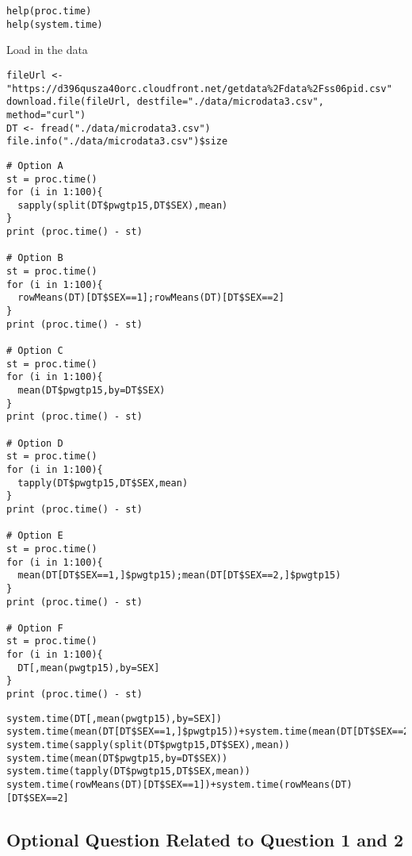 \documentclass[]{article}
\begin{document}
\begin{framed}
\begin{verbatim}
help(proc.time)
help(system.time)
\end{verbatim}
\end{framed}
Load in the data
\begin{framed}
\begin{verbatim}
fileUrl <- "https://d396qusza40orc.cloudfront.net/getdata%2Fdata%2Fss06pid.csv"
download.file(fileUrl, destfile="./data/microdata3.csv", method="curl")
DT <- fread("./data/microdata3.csv")
file.info("./data/microdata3.csv")$size
\end{verbatim}
\end{framed}
\newpage
\begin{framed}
\begin{verbatim}
# Option A
st = proc.time()
for (i in 1:100){
  sapply(split(DT$pwgtp15,DT$SEX),mean)
}
print (proc.time() - st)

# Option B
st = proc.time()
for (i in 1:100){
  rowMeans(DT)[DT$SEX==1];rowMeans(DT)[DT$SEX==2]
}
print (proc.time() - st)

# Option C
st = proc.time()
for (i in 1:100){
  mean(DT$pwgtp15,by=DT$SEX)
}
print (proc.time() - st)

# Option D
st = proc.time()
for (i in 1:100){
  tapply(DT$pwgtp15,DT$SEX,mean)
}
print (proc.time() - st)

# Option E
st = proc.time()
for (i in 1:100){
  mean(DT[DT$SEX==1,]$pwgtp15);mean(DT[DT$SEX==2,]$pwgtp15)
}
print (proc.time() - st)

# Option F
st = proc.time()
for (i in 1:100){
  DT[,mean(pwgtp15),by=SEX]
}
print (proc.time() - st)
\end{verbatim}
\end{framed}

\newpage
\begin{framed}
\begin{verbatim}
system.time(DT[,mean(pwgtp15),by=SEX])
system.time(mean(DT[DT$SEX==1,]$pwgtp15))+system.time(mean(DT[DT$SEX==2,]$pwgtp15))
system.time(sapply(split(DT$pwgtp15,DT$SEX),mean))
system.time(mean(DT$pwgtp15,by=DT$SEX))
system.time(tapply(DT$pwgtp15,DT$SEX,mean))
system.time(rowMeans(DT)[DT$SEX==1])+system.time(rowMeans(DT)[DT$SEX==2]
\end{verbatim}
\end{framed}


\newpage
\subsection*{Optional Question Related to Question 1 and 2}
\end{document}
